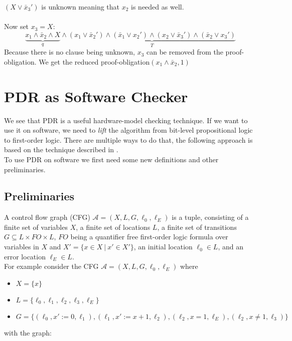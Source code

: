 \documentclass[11pt, a4paper, BCOR=10mm, ngerman, oneside]{scrbook}
\begin{document}
$(X \lor \bar x_3')$ is unknown meaning that $x_2$  is needed as well. \\ \\

Now set $x_3 = X$: \\
\begin{equation*}
\underbrace{x_1 \land \bar x_2 \land X}_{q} \land \underbrace{(x_1 \lor \bar x_2' ) \land ( \bar x_1 \lor x_2') \land (x_2 \lor \bar x_3') \land ( \bar x_2 \lor x_3')}_{T}
\end{equation*}
Because there is no clause being unknown, $x_3$ can be removed from the proof-obligation. We get the reduced proof-obligation$(x_1 \land \bar x_2, 1)$

\pagebreak


\chapter{PDR as Software Checker} \label{sec3}
We see that PDR is a useful hardware-model checking technique. If we want to use it on software, we need to \textsl{lift} the algorithm from bit-level propositional logic to first-order logic. There are multiple ways to do that, the following approach is based on the technique described in \cite{Zitat05}. \\ To use PDR on software we first need some new definitions and other preliminaries.

\section{Preliminaries}
A control flow graph (CFG) $\mathcal{A} = (X, L, G, \ell_0, \ell_E)$ is a tuple, consisting of a finite set of variables $X$, a finite set of locations $L$, a finite set of transitions $G \subseteq L \times FO \times L$, $FO$ being a quantifier free first-order logic formula over variables in $X$ and $X' = \{x \in X \ | \ x' \in X'\}$, an initial location $\ell_0 \in L$, and an error location $\ell_E \in L$.\\ 


For example consider the CFG $\mathcal{A} = (X, L, G, \ell_0, \ell_E)$ where
\begin{itemize}
\item $X = \{x\}$
\item $L = \{\ell_0, \ell_1, \ell_2, \ell_3, \ell_E\}$
\item $G = \{(\ell_0, x' := 0, \ell_1), (\ell_1, x' := x + 1, \ell_2), (\ell_2, x = 1, \ell_E), (\ell_2, x \neq 1, \ell_3) \} $
\end{itemize}
with the graph: \\
\end{document}
